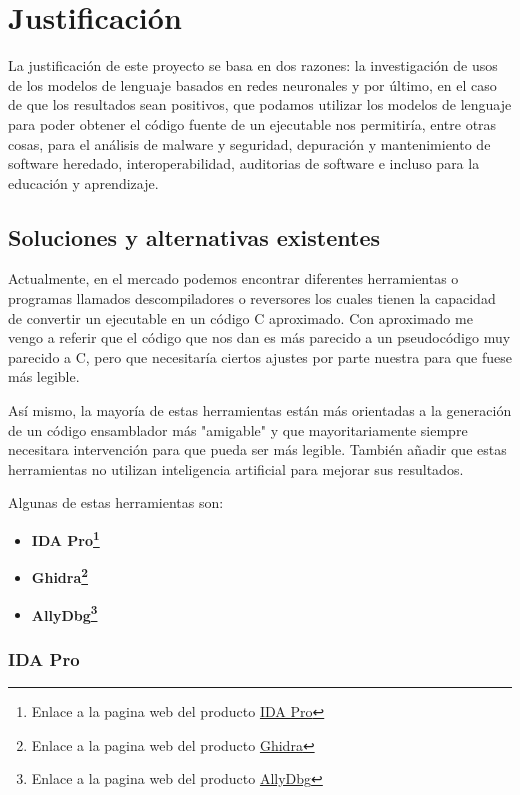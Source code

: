 \chapter{Justificación}
\label{cap:justificacion}


La justificación de este proyecto se basa en dos razones: la investigación de usos de los modelos de lenguaje basados en redes neuronales y por último,
en el caso de que los resultados sean positivos, que podamos utilizar los modelos de lenguaje para poder obtener el código fuente de un ejecutable nos
permitiría, entre otras cosas, para el análisis de malware y seguridad, depuración y mantenimiento de software heredado, interoperabilidad, auditorias
de software e incluso para la educación y aprendizaje.

\section{Soluciones y alternativas existentes}
\label{sec:alternativas}

Actualmente, en el mercado podemos encontrar diferentes herramientas o programas llamados descompiladores o reversores los cuales tienen la capacidad de convertir un ejecutable
en un código C aproximado. Con aproximado me vengo a referir que el código que nos dan es más parecido a un pseudocódigo muy parecido a C, pero que necesitaría ciertos ajustes
por parte nuestra para que fuese más legible.

Así mismo, la mayoría de estas herramientas están más orientadas a la generación de un código ensamblador más "amigable" y que mayoritariamente siempre necesitara intervención
para que pueda ser más legible. También añadir que estas herramientas no utilizan inteligencia artificial para mejorar sus resultados.

Algunas de estas herramientas son:

\begin{itemize}
    \item \bf IDA Pro\footnote{Enlace a la pagina web del producto \href{https://hex-rays.com/ida-pro/}{IDA Pro}}
    \item \bf Ghidra\footnote{Enlace a la pagina web del producto \href{https://ghidra-sre.org/}{Ghidra}}
    \item \bf AllyDbg\footnote{Enlace a la pagina web del producto \href{https://www.ollydbg.de/}{AllyDbg}}
\end{itemize}

\subsection{IDA Pro}
\label{subsec:IDA_pro}

